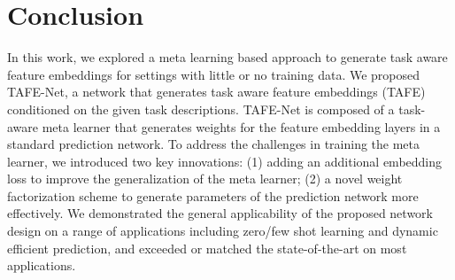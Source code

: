 \documentclass[10pt,twocolumn,letterpaper]{article}
\newcommand{\model}{TAFE-Net\xspace}
\begin{document}
\section{Conclusion}
In this work, we explored a meta learning based approach to generate task aware feature embeddings for settings with little or no training data.
We proposed TAFE-Net, a network that generates task aware feature embeddings (TAFE) conditioned on the given task descriptions.
\model is composed of a task-aware 
meta learner that generates weights for the feature embedding layers in a standard prediction network.
To address the challenges in training the meta learner, we introduced two key
innovations: (1) adding an additional embedding loss to improve the generalization of the meta learner; (2) a novel weight factorization
scheme to generate parameters of the prediction network more effectively. 
We demonstrated the general applicability of the proposed network design on a range of applications including zero/few shot learning and dynamic
efficient prediction, and exceeded or matched the state-of-the-art on most applications. 





{\small


}
% 
\end{document}
